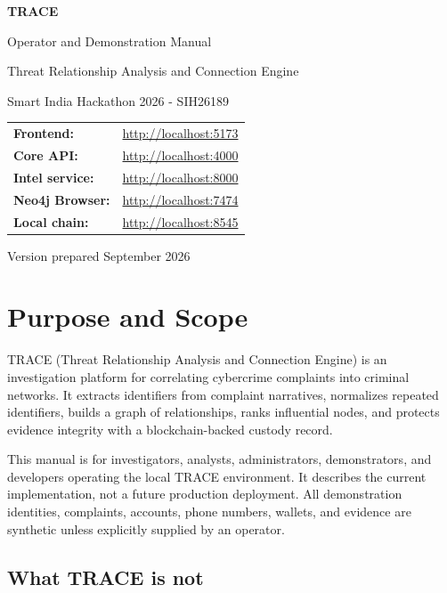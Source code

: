 \documentclass[11pt,a4paper]{article}
\begin{document}
\begin{titlepage}
  \centering
  \vspace*{25mm}
  {\Huge\bfseries\color{argusblue} TRACE\par}
  \vspace{5mm}
  {\LARGE Operator and Demonstration Manual\par}
  \vspace{12mm}
  {\large Threat Relationship Analysis and Connection Engine\par}
  \vspace{4mm}
  {\large Smart India Hackathon 2026 - SIH26189\par}
  \vfill
  \begin{tabular}{ll}
    \textbf{Frontend:} & \url{http://localhost:5173} \\
    \textbf{Core API:} & \url{http://localhost:4000} \\
    \textbf{Intel service:} & \url{http://localhost:8000} \\
    \textbf{Neo4j Browser:} & \url{http://localhost:7474} \\
    \textbf{Local chain:} & \url{http://localhost:8545}
  \end{tabular}
  \vfill
  {\small Version prepared September 2026\par}
\end{titlepage}

\tableofcontents
\newpage

\section{Purpose and Scope}

TRACE (Threat Relationship Analysis and Connection Engine) is an investigation platform for correlating cybercrime complaints into criminal networks. It extracts identifiers from complaint narratives, normalizes repeated identifiers, builds a graph of relationships, ranks influential nodes, and protects evidence integrity with a blockchain-backed custody record.

This manual is for investigators, analysts, administrators, demonstrators, and developers operating the local TRACE environment. It describes the current implementation, not a future production deployment. All demonstration identities, complaints, accounts, phone numbers, wallets, and evidence are synthetic unless explicitly supplied by an operator.

\subsection{What TRACE is not}
\end{document}
